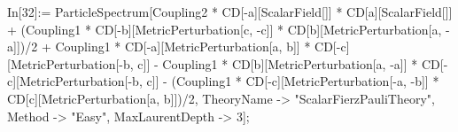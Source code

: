 In[32]:= ParticleSpectrum[Coupling2 * CD[-a][ScalarField[]] * CD[a][ScalarField[]] + (Coupling1 * CD[-b][MetricPerturbation[c, -c]] * CD[b][MetricPerturbation[a, -a]])/2 + Coupling1 * CD[-a][MetricPerturbation[a, b]] * CD[-c][MetricPerturbation[-b, c]] - Coupling1 * CD[b][MetricPerturbation[a, -a]] * CD[-c][MetricPerturbation[-b, c]] - (Coupling1 * CD[-c][MetricPerturbation[-a, -b]] * CD[c][MetricPerturbation[a, b]])/2, TheoryName -> "ScalarFierzPauliTheory", Method -> "Easy", MaxLaurentDepth -> 3]; 